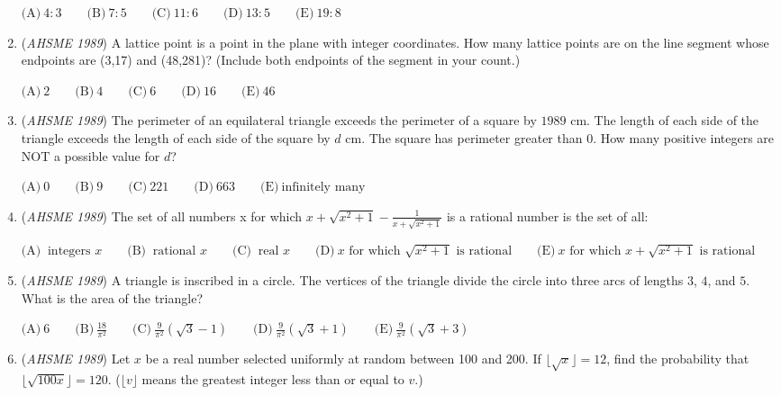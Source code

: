 \begin{enumerate}
$\textrm{(A)}\ 4:3\qquad\textrm{(B)}\ 7:5\qquad\textrm{(C)}\ 11:6\qquad\textrm{(D)}\ 13:5\qquad\textrm{(E)}\ 19:8$


	\item (\textit{AHSME 1989}) A lattice point is a point in the plane with integer coordinates. How many lattice points are on the line segment whose endpoints are (3,17) and (48,281)? (Include both endpoints of the segment in your count.)


 $\textrm{(A)}\ 2\qquad\textrm{(B)}\ 4\qquad\textrm{(C)}\ 6\qquad\textrm{(D)}\ 16\qquad\textrm{(E)}\ 46$


	\item (\textit{AHSME 1989}) The perimeter of an equilateral triangle exceeds the perimeter of a square by $1989$ cm. The length of each side of the triangle exceeds the length of each side of the square by $d$ cm. The square has perimeter greater than 0. How many positive integers are NOT a possible value for $d$?


 $\textrm{(A)}\ 0\qquad\textrm{(B)}\ 9\qquad\textrm{(C)}\ 221\qquad\textrm{(D)}\ 663\qquad\textrm{(E)}\ \text{infinitely many}$


	\item (\textit{AHSME 1989}) The set of all numbers x for which $x+\sqrt{x^{2}+1}-\frac{1}{x+\sqrt{x^{2}+1}}$ is a rational number is the set of all:


 $\textrm{(A)}\ \text{ integers }x\qquad\textrm{(B)}\ \text{ rational }x\qquad\textrm{(C)}\ \text{ real }x\qquad\textrm{(D)}\ x\text{ for which }\sqrt{x^{2}+1}\text{ is rational}\qquad\textrm{(E)}\ x\text{ for which }x+\sqrt{x^{2}+1}\text{ is rational }$


	\item (\textit{AHSME 1989}) A triangle is inscribed in a circle. The vertices of the triangle divide the circle into three arcs of lengths $3$, $4$, and $5$. What is the area of the triangle?


 $\textrm{(A)}\ 6\qquad\textrm{(B)}\ \frac{18}{\pi^{2}}\qquad\textrm{(C)}\ \frac{9}{\pi^{2}}\left(\sqrt{3}-1\right)\qquad\textrm{(D)}\ \frac{9}{\pi^{2}}\left(\sqrt{3}+1\right)\qquad\textrm{(E)}\ \frac{9}{\pi^{2}}\left(\sqrt{3}+3\right)$


	\item (\textit{AHSME 1989}) Let $x$ be a real number selected uniformly at random between 100 and 200. If $\lfloor {\sqrt{x}} \rfloor = 12$, find the probability that $\lfloor {\sqrt{100x}} \rfloor = 120$. ($\lfloor {v} \rfloor$ means the greatest integer less than or equal to $v$.)



\end{enumerate}

